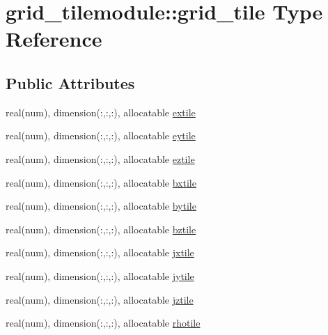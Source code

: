 \hypertarget{structgrid__tilemodule_1_1grid__tile}{}\section{grid\+\_\+tilemodule\+:\+:grid\+\_\+tile Type Reference}
\label{structgrid__tilemodule_1_1grid__tile}
\subsection*{Public Attributes}
\begin{DoxyCompactItemize}
\item 
real(num), dimension(\+:,\+:,\+:), allocatable \hyperlink{structgrid__tilemodule_1_1grid__tile_a26cef624c4cf07784b7d603f4b40c1ca}{extile}
\item 
real(num), dimension(\+:,\+:,\+:), allocatable \hyperlink{structgrid__tilemodule_1_1grid__tile_a7b423cb6c4c9aa06b11015c9e03f2c6e}{eytile}
\item 
real(num), dimension(\+:,\+:,\+:), allocatable \hyperlink{structgrid__tilemodule_1_1grid__tile_a693b13eb28cb4b7aff4d862249c0f885}{eztile}
\item 
real(num), dimension(\+:,\+:,\+:), allocatable \hyperlink{structgrid__tilemodule_1_1grid__tile_a06fc16aafbee41a4483dc8b8a7f62458}{bxtile}
\item 
real(num), dimension(\+:,\+:,\+:), allocatable \hyperlink{structgrid__tilemodule_1_1grid__tile_aab488049b65e06555d2c6763e8d211a6}{bytile}
\item 
real(num), dimension(\+:,\+:,\+:), allocatable \hyperlink{structgrid__tilemodule_1_1grid__tile_a9649e5863bb39e12980658a180af3501}{bztile}
\item 
real(num), dimension(\+:,\+:,\+:), allocatable \hyperlink{structgrid__tilemodule_1_1grid__tile_a2ae4d5e121c4dc5f89c4a3b2d026e24a}{jxtile}
\item 
real(num), dimension(\+:,\+:,\+:), allocatable \hyperlink{structgrid__tilemodule_1_1grid__tile_ad1e55f6d7058569567dd59e6dea33337}{jytile}
\item 
real(num), dimension(\+:,\+:,\+:), allocatable \hyperlink{structgrid__tilemodule_1_1grid__tile_a9e9a97d720db8d94cb82aa4c6cc933c5}{jztile}
\item 
real(num), dimension(\+:,\+:,\+:), allocatable \hyperlink{structgrid__tilemodule_1_1grid__tile_a002aa3dae3299c95d8d20c3d26e694ff}{rhotile}
\end{DoxyCompactItemize}


